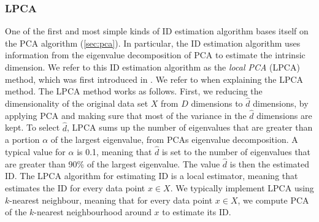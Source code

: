 \subsubsection{LPCA}
\label{sec:id-estimation-lpca}
One of the first and most simple kinds of ID estimation algorithm bases itself on the PCA algorithm (\cref{sec:pca}). In particular, the ID estimation algorithm uses information from the eigenvalue decomposition of PCA to estimate the intrinsic dimension. We refer to this ID estimation algorithm as the \textit{local PCA} (LPCA) method, which was first introduced in \cite{Fukunaga1971}. We refer to \cite{Fukunaga1971} when explaining the LPCA method. The LPCA method works as follows. First, we reducing the dimensionality of the original data set $X$ from $D$ dimensions to $\hat{d}$ dimensions, by applying PCA and making sure that most of the variance in the $\hat{d}$ dimensions are kept. To select $\hat{d}$, LPCA sums up the number of eigenvalues that are greater than a portion $\alpha$ of the largest eigenvalue, from PCAs eigenvalue decomposition. A typical value for $\alpha$ is 0.1, meaning that $\hat{d}$ is set to the number of eigenvalues that are greater than 90\% of the largest eigenvalue. The value $\hat{d}$ is then the estimated ID. The LPCA algorithm for estimating ID is a local estimator, meaning that estimates the ID for every data point $x \in X$. We typically implement LPCA using $k$-nearest neighbour, meaning that for every data point $x \in X$, we compute PCA of the $k$-nearest neighbourhood around $x$ to estimate its ID.

